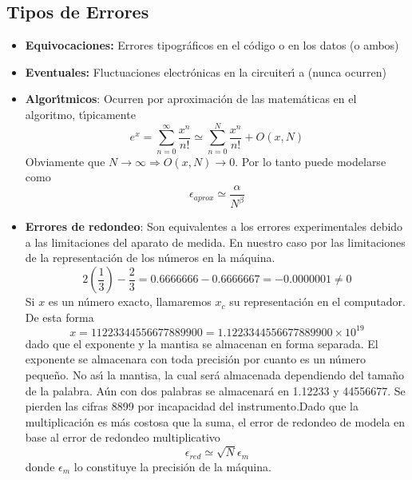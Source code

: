 \documentclass[spanish,titlepage,11pt]{article}
\begin{document}
\subsection{Tipos de Errores}

\begin{itemize}
\item \textbf{Equivocaciones:} Errores tipogr\'{a}ficos en el c\'{o}digo o en
los datos (o ambos)

\item \textbf{Eventuales:} Fluctuaciones electr\'{o}nicas en la circuiter\'{\i
}a (nunca ocurren)

\item \textbf{Algor\'{\i}tmicos}: Ocurren por aproximaci\'{o}n de las
matem\'{a}ticas en el algoritmo, t\'{\i}picamente
\begin{equation}
e^{x}=\sum_{n=0}^{\infty}\frac{x^{n}}{n!}\simeq\sum_{n=0}^{N}\frac{x^{n}}%
{n!}+O(x,N)
\end{equation}
Obviamente que $N\longrightarrow\infty\Longrightarrow O(x,N)\longrightarrow0.$
Por lo tanto puede modelarse como
\begin{equation}
\epsilon_{aprox}\simeq\frac{\alpha}{N^{\beta}}%
\end{equation}

\item \textbf{Errores de redondeo}: Son equivalentes a los errores
experimentales debido a las limitaciones del aparato de medida. En nuestro
caso por las limitaciones de la representaci\'{o}n de los n\'{u}meros en la
m\'{a}quina.
\[
2\left(  \frac{1}{3}\right)  -\frac{2}{3}=0.6666666-0.6666667=-0.0000001\neq0
\]
Si $x$ es un n\'{u}mero exacto, llamaremos $x_{c}$ su representaci\'{o}n en el
computador. De esta forma
\begin{equation}
x=11223344556677889900=1.1223344556677889900\times10^{19}%
\end{equation}
dado que el exponente y la mantisa se almacenan en forma separada. El
exponente se almacenara con toda precisi\'{o}n por cuanto es un n\'{u}mero
peque\~{n}o. No as\'{\i} la mantisa, la cual ser\'{a} almacenada dependiendo
del tama\~{n}o de la palabra. A\'{u}n con dos palabras se almacenar\'{a} en
1.12233 y 44556677. Se pierden las cifras 8899 por incapacidad del
instrumento.\newline Dado que la multiplicaci\'{o}n es m\'{a}s costosa que la
suma, el error de redondeo de modela en base al error de redondeo
multiplicativo
\begin{equation}
\epsilon_{red}\simeq\sqrt{N}\epsilon_{m}%
\end{equation}
donde $\epsilon_{m}$ lo constituye la precisi\'{o}n de la m\'{a}quina.


\end{itemize}
\end{document}
